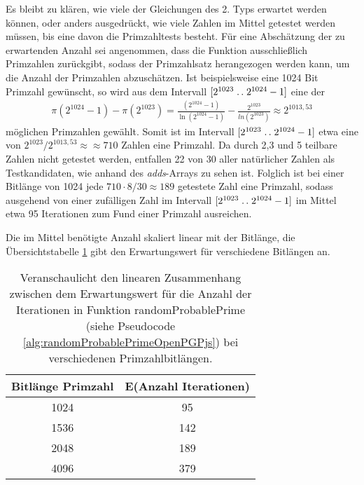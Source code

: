 Es bleibt zu klären, wie viele der Gleichungen des 2. Typs erwartet werden können, oder anders ausgedrückt, wie viele Zahlen im Mittel getestet werden müssen, bis eine davon die Primzahltests besteht. 
Für eine Abschätzung der zu erwartenden Anzahl sei angenommen, dass die Funktion ausschließlich Primzahlen zurückgibt, sodass der Primzahlsatz herangezogen werden kann, um die Anzahl der Primzahlen abzuschätzen.
Ist beispielsweise eine 1024 Bit Primzahl gewünscht, so wird aus dem Intervall $[2^{1023}\mathrel{{.}\,{.}}\nobreak 2^{1024}-1]$ eine der \begin{align}
\pi(2^{1024}-1) - \pi(2^{1023}) = \frac{(2^{1024}-1)}{\ln(2^{1024}-1)} - \frac{2^{1023}}{ln(2^{1023})} \approx 2^{1013,53}
\end{align}
möglichen Primzahlen gewählt.
Somit ist im Intervall $[2^{1023}\mathrel{{.}\,{.}}\nobreak 2^{1024}-1]$ etwa eine von $2^{1023}/2^{1013,53} \approx \approx 710$ Zahlen eine Primzahl.
Da durch 2,3 und 5 teilbare Zahlen nicht getestet werden, entfallen 22 von 30 aller natürlicher Zahlen als Testkandidaten, wie anhand des \textit{adds}-Arrays zu sehen ist.
Folglich ist bei einer Bitlänge von 1024 jede $710 \cdot 8/30 \approx 189$ getestete Zahl eine Primzahl, sodass ausgehend von einer zufälligen Zahl im Intervall $[2^{1023}\mathrel{{.}\,{.}}\nobreak 2^{1024}-1]$ im Mittel etwa 95 Iterationen zum Fund einer Primzahl ausreichen.

Die im Mittel benötigte Anzahl skaliert linear mit der Bitlänge, die Übersichtstabelle \ref{tbl:bitLengthNumberOfIterations} gibt den Erwartungswert für verschiedene Bitlängen an.

\begin{table}[h]
\caption{Veranschaulicht den linearen Zusammenhang zwischen dem Erwartungswert für die Anzahl der Iterationen in Funktion randomProbablePrime (siehe Pseudocode \ref{alg:randomProbablePrimeOpenPGPjs}) bei verschiedenen Primzahlbitlängen.}
\label{tbl:bitLengthNumberOfIterations}
\begin{tabular}{cc}
\toprule
Bitlänge Primzahl          & E(Anzahl Iterationen) \\
\midrule
1024                       & 95                    \\
1536                       & 142                   \\
2048                       & 189                   \\
4096                       & 379                   \\
\bottomrule
\end{tabular}
\end{table}

